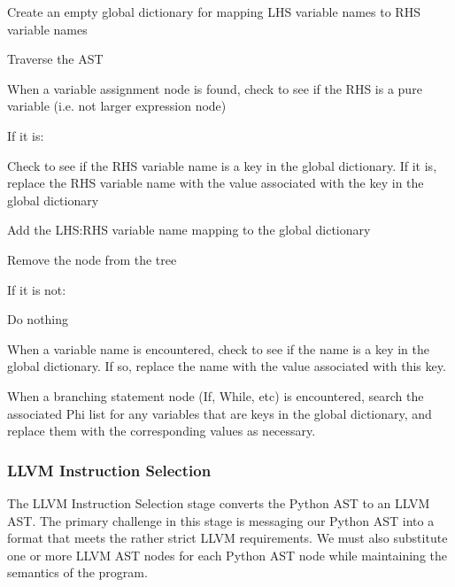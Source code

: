 \documentclass[11pt,twocolumn]{article}
\newenvironment{packed_enum}{
\begin{enumerate}
  \setlength{\itemsep}{1pt}
  \setlength{\parskip}{0pt}
  \setlength{\parsep}{0pt}
}{\end{enumerate}}
\begin{document}
\begin{packed_enum}
\item Create an empty global dictionary for mapping LHS variable names
  to RHS variable names
\item Traverse the AST
\item When a variable assignment node is found, check to see if the
  RHS is a pure variable (i.e. not larger expression node)
  \begin{packed_enum}
  \item If it is:
    \begin{packed_enum}
    \item Check to see if the RHS variable name is a key in the
      global dictionary. If it is, replace the RHS variable name with the
      value associated with the key in the global dictionary
    \item Add the LHS:RHS variable name mapping to the global dictionary
    \item Remove the node from the tree
    \end{packed_enum}
  \item If it is not:
    \begin{packed_enum}
      \item Do nothing
    \end{packed_enum}
  \end{packed_enum}
\item When a variable name is encountered, check to see if the name is
  a key in the global dictionary. If so, replace the name with the
  value associated with this key.
\item When a branching statement node (If, While, etc) is encountered,
  search the associated Phi list for any variables that are keys in
  the global dictionary, and replace them with the corresponding
  values as necessary.
\end{packed_enum}

\subsubsection{LLVM Instruction Selection}
\label{sec:stage-LLVMInstructionSelection}

The LLVM Instruction Selection stage converts the Python AST to an LLVM
AST. The primary challenge in this stage is messaging our Python AST
into a format that meets the rather strict LLVM requirements. We must
also substitute one or more LLVM AST nodes for each Python AST node
while maintaining the semantics of the program.
\end{document}
